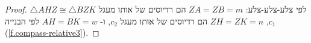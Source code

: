 \begin{proof}

$\triangle AHZ\cong\triangle BZK$
לפי צלע-צלע-צלע: 
$\overline{ZA}=\overline{ZB}=m$
הם רדיוסים של אותו מעגל
$c_1$,
$\overline{ZH}=\overline{ZK}=n$
הם רדיוסים של אותו מעגל
$c_2$,
ו-%
$\overline{AH}=\overline{BK}=w$
לפי הבנייה
(\ref{f.compass-relative3}).


\end{proof}
